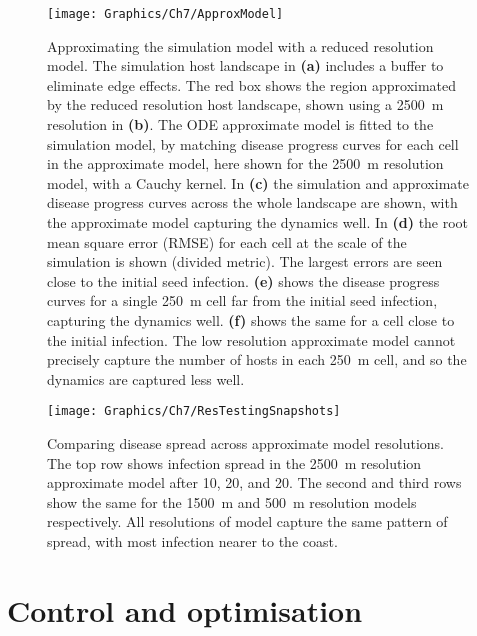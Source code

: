 \begin{figure}
    \begin{center}
        \texttt{[image: Graphics/Ch7/ApproxModel]}
        \caption[Approximating the simulation model with a reduced resolution model]{Approximating the simulation model with a reduced resolution model. The simulation host landscape in \textbf{(a)} includes a buffer to eliminate edge effects. The red box shows the region approximated by the reduced resolution host landscape, shown using a \SI{2500}{\meter} resolution in \textbf{(b)}. The ODE approximate model is fitted to the simulation model, by matching disease progress curves for each cell in the approximate model, here shown for the \SI{2500}{\meter} resolution model, with a Cauchy kernel. In \textbf{(c)} the simulation and approximate disease progress curves across the whole landscape are shown, with the approximate model capturing the dynamics well. In \textbf{(d)} the root mean square error (RMSE) for each cell at the scale of the simulation is shown (divided metric). The largest errors are seen close to the initial seed infection. \textbf{(e)} shows the disease progress curves for a single \SI{250}{\meter} cell far from the initial seed infection, capturing the dynamics well. \textbf{(f)} shows the same for a cell close to the initial infection. The low resolution approximate model cannot precisely capture the number of hosts in each \SI{250}{\meter} cell, and so the dynamics are captured less well.\label{fig:ch7:approx_model}}
    \end{center}
\end{figure}

\begin{figure}
    \begin{center}
        \texttt{[image: Graphics/Ch7/ResTestingSnapshots]}
        \caption[Comparing disease spread across approximate model resolutions]{Comparing disease spread across approximate model resolutions. The top row shows infection spread in the \SI{2500}{\meter} resolution approximate model after 10, 20, and \SI{20}{\years}. The second and third rows show the same for the \SI{1500}{\meter} and \SI{500}{\meter} resolution models respectively. All resolutions of model capture the same pattern of spread, with most infection nearer to the coast.}
    \end{center}
\end{figure}

\section{Control and optimisation}

